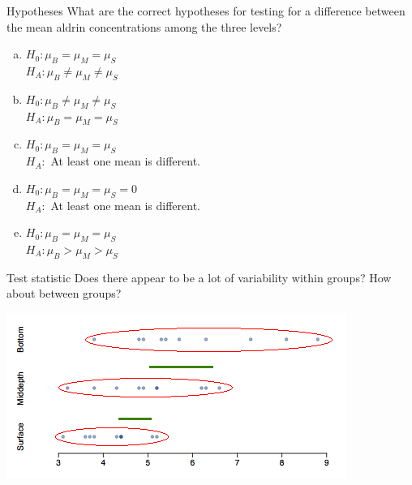 \documentclass[
  ignorenonframetext,
]{beamer}
\begin{document}
\begin{frame}{Hypotheses}
\protect\hypertarget{hypotheses-1}{}
\alert{What are the correct hypotheses for testing for a difference between the mean aldrin concentrations among the three levels?}

\begin{enumerate}[(a)]
\item $H_0: \mu_B = \mu_M = \mu_S$ \\
$H_A: \mu_B \ne \mu_M \ne \mu_S$ \\
\item $H_0: \mu_B \ne \mu_ M \ne \mu_S$ \\
$H_A: \mu_B = \mu_M = \mu_S$ \\
\item \alert{$H_0: \mu_B = \mu_M = \mu_S$} \\
\alert{$H_A:$ At least one mean is different.}
\item $H_0: \mu_B = \mu_M = \mu_S = 0$ \\
$H_A:$ At least one mean is different.
\item $H_0: \mu_B = \mu_M = \mu_S$ \\
$H_A: \mu_B > \mu_M > \mu_S$ \\
\end{enumerate}
\end{frame}

\begin{frame}{Test statistic}
\protect\hypertarget{test-statistic}{}
\alert{Does there appear to be a lot of variability within groups? How about between groups?}


\includegraphics[width=\textwidth,height=0.4\textheight]{dotplot_var.png}
\end{frame}
\end{document}
